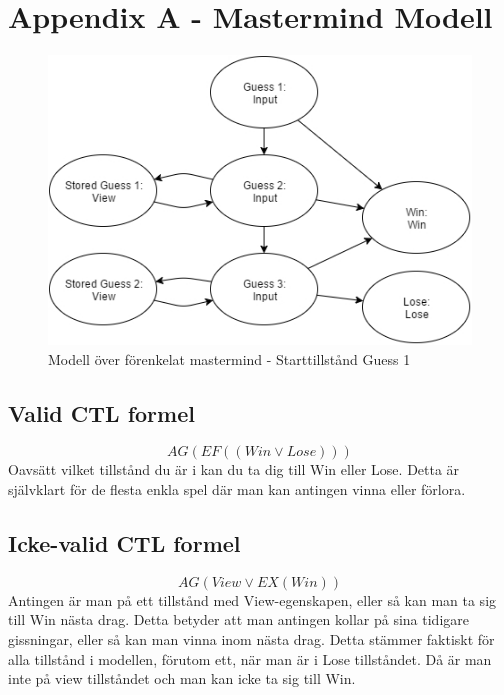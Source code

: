 \documentclass[a4paper]{article}
\begin{document}
\section{Appendix A - Mastermind Modell}
\begin{figure}
\includegraphics[width = \textwidth]{modell.jpg}
\caption{Modell över förenkelat mastermind - Starttillstånd Guess 1}
\end{figure}

\subsection{Valid CTL formel}
$$AG (EF ((Win \lor Lose)))$$
Oavsätt vilket tillstånd du är i kan du ta dig till Win eller Lose. Detta är självklart för de flesta enkla spel där man kan antingen vinna eller förlora.
\subsection{Icke-valid CTL formel}
$$AG (View \lor EX(Win))$$
Antingen är man på ett tillstånd med View-egenskapen, eller så kan man ta sig till Win nästa drag. Detta betyder att man antingen kollar på sina tidigare gissningar, eller så kan man vinna inom nästa drag. Detta stämmer faktiskt för alla tillstånd i modellen, förutom ett, när man är i Lose tillståndet. Då är man inte på view tillståndet och man kan icke ta sig till Win. 
\end{document}
